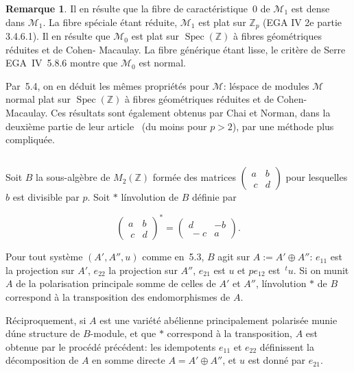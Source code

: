 \documentclass[11pt,a4paper]{article}
\theoremstyle{plain}
\theoremstyle{definition}
\newtheorem{remark}[theorem]{Remarque}
\DeclareMathOperator{\Spec}{Spec}
\begin{document}
\begin{remark}
Il en r\'esulte que la fibre de caract\'eristique~0 de $\mathscr{M}_1$ est dense dans $\mathscr{M}_1$. La fibre
sp\'eciale \'etant r\'eduite, $\mathscr{M}_1$ est plat sur $\mathbb{Z}_p$ (EGA IV 2e partie 3.4.6.1). Il en r\'esulte
que $\mathscr{M}_0$ est plat sur $\Spec(\mathbb{Z})$ \`a fibres g\'eom\'etriques r\'eduites et de Cohen-
Macaulay. La fibre g\'en\'erique \'etant lisse, le crit\`ere de Serre EGA~IV~5.8.6
montre que $\mathscr{M}_0$ est normal.

Par~5.4, on en d\'eduit les m\^emes propri\'et\'es pour $\mathscr{M}$: l\'espace de modules $\mathscr{M}$
normal plat sur $\Spec(\mathbb{Z})$ \`a fibres g\'eom\'etriques r\'eduites et de Cohen-
Macaulay. Ces r\'esultats sont \'egalement obtenus par Chai et Norman, dans la
deuxi\`eme partie de leur article~\cite{ChaiNorman} (du moins pour $p > 2$), par une m\'ethode
plus compliqu\'ee.
\end{remark}

\subsection{}

Soit $B$ la sous-alg\`ebre de $M_2(\mathbb{Z})$ form\'ee des matrices $\begin{pmatrix} a & b \\\ c & d \end{pmatrix}$ pour lesquelles
$b$ est divisible par $p$. Soit $*$ l\'involution de $B$ d\'efinie par

\begin{equation}
\begin{pmatrix} a & b \\\ c & d \end{pmatrix}^* = \begin{pmatrix} d & -b \\\ -c & a \end{pmatrix}.
\end{equation}

Pour tout syst\`eme $(A', A'', u)$ comme en~5.3, $B$ agit sur $A := A' \oplus A''$: $e_{11}$ est la
projection sur $A'$, $e_{22}$ la projection sur $A''$, $e_{21}$ est $u$ et $pe_{12}$ est $\,\!^t u$. Si on munit
$A$ de la polarisation principale somme de celles de $A'$ et $A''$, l\'involution $*$ de
$B$ correspond \`a la transposition des endomorphismes de $A$.

R\'eciproquement, si $A$ est une vari\'et\'e ab\'elienne principalement polaris\'ee
munie d\'une structure de $B$-module, et que $*$ correspond \`a la transposition, $A$
est obtenue par le proc\'ed\'e pr\'ec\'edent: les idempotents $e_{11}$ et $e_{22}$ d\'efinissent la
d\'ecomposition de $A$ en somme directe $A = A' \oplus A''$, et $u$ est donn\'e par $e_{21}$.
\end{document}

